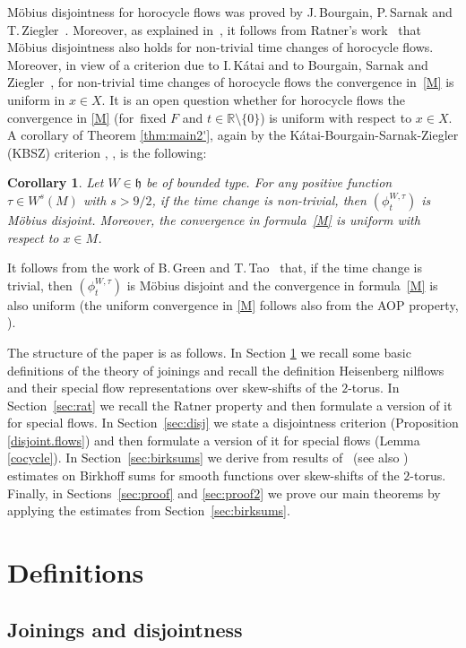 \documentclass[JEP,XML,SOM,Unicode,NoEqCountersInSection]{cedram}
\theoremstyle{definition}
\theoremstyle{plain}
\newtheorem{corollary}[definition]{Corollary}
\newcommand\RR{\mathbb{R}}
\begin{document}
Möbius disjointness for horocycle flows was proved by J.\,Bourgain, P.\,Sarnak and T.\,Ziegler~\cite{BSZ}. Moreover, as explained in~\cite{FlaFo2}, it follows from Ratner's work~\cite{Rat2} that Möbius disjointness also holds for non-trivial time changes of horocycle flows. Moreover, in view of a criterion due to I.\,Kátai \cite{K} and to Bourgain, Sarnak and Ziegler~\cite{BSZ}, for non-trivial time changes of horocycle flows the convergence in~\eqref{M} is uniform in $x\in X$. It is an open question whether for horocycle flows the convergence in \eqref{M} (for~fixed $F$ and $t\in \RR\setminus \{0\}$) is uniform with respect to $x\in X$. A corollary of Theorem \ref{thm:main2'}, again by the Kátai-Bourgain-Sarnak-Ziegler (KBSZ) criterion \cite{K}, \cite{BSZ}, is the following:
\begin{corollary} Let $W\in \mathfrak h$ be of bounded type. For any positive function $\tau\in W^s(M)$ with $s>9/2$, if the time change is non-trivial, then $(\phi_t^{W,\tau})$ is Möbius disjoint. Moreover, the convergence in formula~\eqref{M} is uniform with respect to $x\in M$.
\end{corollary}
It follows from the work of B.\,Green and T.\,Tao~\cite{GT} that, if the time change is trivial, then $(\phi_t^{W,\tau})$ is Möbius
disjoint and the convergence in formula~\eqref{M} is also uniform (the uniform convergence in \eqref{M} follows also from the AOP property, \cite{FFKL}).

The structure of the paper is as follows. In Section \ref{sec.def} we recall some basic definitions of the theory of
joinings and recall the definition Heisenberg nilflows and their special flow representations over skew-shifts of the $2$-torus. In Section~\ref{sec:rat} we recall the Ratner property and then formulate a version of it for special flows. In Section~\ref{sec:disj} we state a disjointness criterion (Proposition \ref{disjoint.flows}) and then formulate a version of it for special flows (Lemma \ref{cocycle}). In Section~\ref{sec:birksums} we derive from results of~\cite{FlaFo1} (see also \cite{FoSurvey}) estimates on Birkhoff sums for smooth functions over skew-shifts of the $2$-torus. Finally, in Sections~\ref{sec:proof} and \ref{sec:proof2} we prove our main theorems by applying the estimates from Section~\ref{sec:birksums}.

\section{Definitions}\label{sec.def}
\subsection{Joinings and disjointness}\label{sec.dis}
\end{document}
